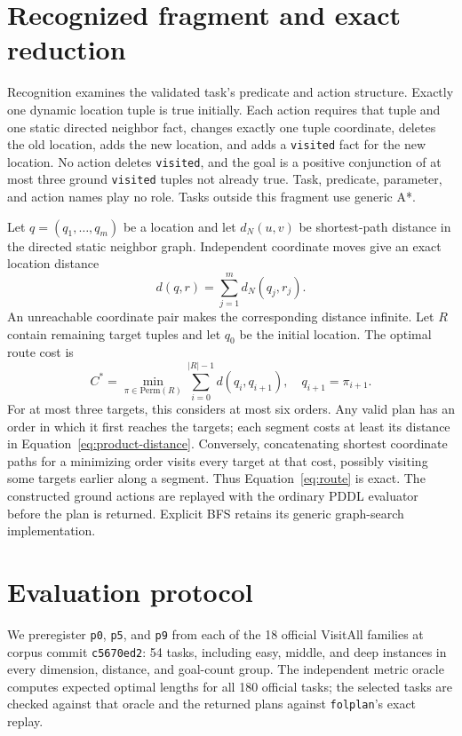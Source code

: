\documentclass[10pt,a4paper]{article}
\begin{document}
\section{Recognized fragment and exact reduction}
Recognition examines the validated task's predicate and action structure.
Exactly one dynamic location tuple is true initially. Each action requires
that tuple and one static directed neighbor fact, changes exactly one tuple
coordinate, deletes the old location, adds the new location, and adds a
\texttt{visited} fact for the new location. No action deletes \texttt{visited},
and the goal is a positive conjunction of at most three ground
\texttt{visited} tuples not already true. Task, predicate, parameter, and
action names play no role. Tasks outside this fragment use generic A*.

Let $q=(q_1,\ldots,q_m)$ be a location and let $d_N(u,v)$ be shortest-path
distance in the directed static neighbor graph. Independent coordinate moves
give an exact location distance
\begin{equation}
  d(q,r)=\sum_{j=1}^{m}d_N(q_j,r_j).
  \label{eq:product-distance}
\end{equation}
An unreachable coordinate pair makes the corresponding distance infinite.
Let $R$ contain remaining target tuples and let $q_0$ be the initial
location. The optimal route cost is
\begin{equation}
  C^*=\min_{\pi\in\mathrm{Perm}(R)}
       \sum_{i=0}^{|R|-1} d(q_i,q_{i+1}),
  \quad q_{i+1}=\pi_{i+1}.
  \label{eq:route}
\end{equation}
For at most three targets, this considers at most six orders. Any valid plan
has an order in which it first reaches the targets; each segment costs at
least its distance in Equation~\ref{eq:product-distance}. Conversely,
concatenating shortest coordinate paths for a minimizing order visits every
target at that cost, possibly visiting some targets earlier along a segment.
Thus Equation~\ref{eq:route} is exact. The constructed ground actions are
replayed with the ordinary PDDL evaluator before the plan is returned.
Explicit BFS retains its generic graph-search implementation.

\section{Evaluation protocol}
We preregister \texttt{p0}, \texttt{p5}, and \texttt{p9} from each of the 18
official VisitAll families at corpus commit \texttt{c5670ed2}: 54 tasks,
including easy, middle, and deep instances in every dimension, distance,
and goal-count group. The independent metric oracle computes expected
optimal lengths for all 180 official tasks; the selected tasks are checked
against that oracle and the returned plans against \texttt{folplan}'s exact
replay.
\end{document}
